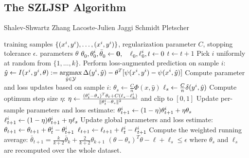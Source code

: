  
\subsection{The SZLJSP Algorithm}
\begin{algorithm*}[t]
    \caption{Shalev-Shwartz Zhang Lacoste-Julien Jaggi Schmidt Pletscher\label{alg_szljsp}}
    \begin{doublespacing}
    \begin{algorithmic}[1]
        \Require training samples $\{ (x^{i}, y^{i}), \dots, (x^{i}, y^{i})\}$, regularization parameter $C$, stopping tolerance $\epsilon$.
        \Ensure parameters $\theta$
        \State  $\displaystyle \theta_0^{\vphantom{i}}, \theta_0^{i}, \bar{\theta}_0^{\vphantom{i}} \leftarrow \mathbf{0},\quad \ell_0^{\vphantom{i}}, \ell_0^{i}, t \leftarrow 0 $
        \Repeat
            \State $t \leftarrow t + 1$
            \State Pick $i$ uniformly at random from $\{1, \dotsc, k\}$.
            \State Perform loss-augmented prediction on sample $i$:
            \Statex[2]   $\hat{y} \leftarrow I(x^{i}, y^{i}, \theta) := \displaystyle \operatorname*{argmax}_{\hat{y}\in\mathcal{Y}} \Delta(y^{i}, \hat{y}) - \theta^T [\psi(x^{i}, y^{i}) - \psi(x^{i}, \hat{y})]$
            \State Compute parameter and loss updates based on sample $i$:
            \Statex[2]     $\theta_s \leftarrow \frac{C}{n} \Phi(x, \hat{y})$
            \Statex[2]     $\ell_s \leftarrow \frac{C}{n} \delta(y^{i}, \hat{y})$
            \State Compute optimum step size $\eta$:
            \Statex[2]    $\eta \leftarrow \frac{(\theta_t^{i} - \theta_s)^T \theta_t + C (\ell_s - \ell_k^{i} )}{\lVert \theta_t^{i} - \theta_s \rVert^2}$ and clip to $[0, 1]$
            \State Update per-sample parameters and loss estimate:
            \Statex[2]    $\theta_{t+1}^{i} \leftarrow (1 - \eta) \theta_{t+1}^{i} + \eta \theta_s$
            \Statex[2]    $\ell_{t+1}^{i} \leftarrow (1 - \eta) \theta_{t+1}^{i} + \eta \ell_s$
            \State Update global parameters and loss estimate:
            \Statex[2]   $\theta_{t+1} \leftarrow \theta_{t+1} + \theta_{t}^{i} - \theta_{t+1}^{i}$
            \Statex[2]   $\ell_{t+1} \leftarrow \ell_{t+1} + \ell_{t}^{i} - \ell_{t+1}^{i}$
            \State Compute the weighted running average:
            \Statex[2] $\bar{\theta}_{t+1} = \frac{k}{k + 2} \bar{\theta}_k + \frac{2}{k + 2}\theta_{k+1}$
        \Until $(\theta - \theta_s)^T\theta - \ell + \ell_s \leq \epsilon$
        \Statex where $\theta_s$ and $\ell_s$ are recomputed over the whole dataset.
    \end{algorithmic}
    \end{doublespacing}
\end{algorithm*}

